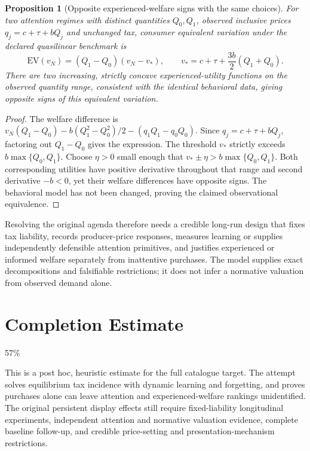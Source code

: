 \documentclass[11pt]{article}
\newtheorem{proposition}[theorem]{Proposition}
\theoremstyle{remark}\newtheorem{remark}[theorem]{Remark}
\begin{document}
\begin{proposition}[Opposite experienced-welfare signs with the same choices]
For two attention regimes with distinct quantities $Q_0,Q_1$, observed inclusive prices $q_j=c+\tau+bQ_j$ and unchanged tax, consumer equivalent variation under the declared quasilinear benchmark is
\[
 \mathrm{EV}(v_N)=(Q_1-Q_0)(v_N-v_*),\qquad
 v_*=c+\tau+\frac{3b}{2}(Q_1+Q_0).
\]
There are two increasing, strictly concave experienced-utility functions on the observed quantity range, consistent with the identical behavioral data, giving opposite signs of this equivalent variation.
\end{proposition}
\begin{proof}
The welfare difference is $v_N(Q_1-Q_0)-b(Q_1^2-Q_0^2)/2-(q_1Q_1-q_0Q_0)$. Since $q_j=c+\tau+bQ_j$, factoring out $Q_1-Q_0$ gives the expression. The threshold $v_*$ strictly exceeds $b\max\{Q_0,Q_1\}$. Choose $\eta>0$ small enough that $v_*\pm\eta>b\max\{Q_0,Q_1\}$. Both corresponding utilities have positive derivative throughout that range and second derivative $-b<0$, yet their welfare differences have opposite signs. The behavioral model has not been changed, proving the claimed observational equivalence.
\end{proof}

Resolving the original agenda therefore needs a credible long-run design that fixes tax liability, records producer-price responses, measures learning or supplies independently defensible attention primitives, and justifies experienced or informed welfare separately from inattentive purchases. The model supplies exact decompositions and falsifiable restrictions; it does not infer a normative valuation from observed demand alone.

\section{Completion Estimate}
57\%

This is a post hoc, heuristic estimate for the full catalogue target.
The attempt solves equilibrium tax incidence with dynamic learning and forgetting, and proves purchases alone can leave attention and experienced-welfare rankings unidentified. The original persistent display effects still require fixed-liability longitudinal experiments, independent attention and normative valuation evidence, complete baseline follow-up, and credible price-setting and presentation-mechanism restrictions.
\end{document}
